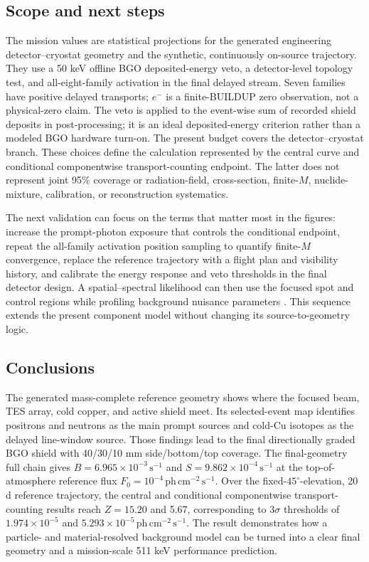 \documentclass[11pt]{article}
\newcommand{\phcms}{\ensuremath{\,\mathrm{ph\,cm^{-2}\,s^{-1}}}}
\newcommand{\cps}{\ensuremath{\,\mathrm{s^{-1}}}}
\newcommand{\fzero}{F_{0}}
\begin{document}
\subsection{Scope and next steps}
\label{subsec:limitations}

The mission values are statistical projections for the generated engineering
detector--cryostat geometry and the synthetic, continuously on-source trajectory.
They use a 50 keV offline BGO deposited-energy veto, a detector-level topology
test, and all-eight-family activation in
the final delayed stream. Seven families have positive delayed transports; $e^-$
is a finite-BUILDUP zero observation, not a physical-zero claim. The veto is
applied to the event-wise sum of recorded shield deposits in post-processing;
it is an ideal deposited-energy criterion rather than a modeled BGO hardware
turn-on. The present budget covers the detector--cryostat branch. These choices define the calculation
represented by the central curve and conditional componentwise transport-counting
endpoint. The latter does not represent joint 95\% coverage or radiation-field,
cross-section, finite-$M$, nuclide-mixture, calibration, or reconstruction
systematics.

The next validation can focus on the terms that matter most in the figures: increase
the prompt-photon exposure that controls the conditional endpoint, repeat the
all-family activation position sampling to quantify finite-$M$ convergence, replace the reference trajectory
with a flight plan and visibility history, and calibrate the energy response and veto
thresholds in the final detector design. A spatial--spectral likelihood can then use
the focused spot and control regions while profiling background nuisance parameters
\cite{Cowan2011}. This sequence extends the present component model without
changing its source-to-geometry logic.

\subsection{Conclusions}
\label{sec:conclusions}

The generated mass-complete reference geometry shows where the focused beam, TES array,
cold copper, and active shield meet. Its selected-event map identifies positrons and
neutrons as the main prompt sources and cold-Cu isotopes as the delayed line-window
source. Those findings lead to the final directionally graded BGO shield with
40/30/10 mm side/bottom/top coverage. The final-geometry full chain gives
$B=6.965\times10^{-3}\cps$ and $S=9.862\times10^{-4}\cps$ at the
top-of-atmosphere reference flux $\fzero=10^{-4}\phcms$. Over the fixed-$45^\circ$-elevation,
20 d reference trajectory, the central and conditional componentwise
transport-counting results reach $Z=15.20$ and 5.67, corresponding to
$3\sigma$ thresholds of $1.974\times10^{-5}$ and
$5.293\times10^{-5}\phcms$. The result demonstrates how a particle- and
material-resolved background model can be turned into a clear final geometry and
a mission-scale 511 keV performance prediction.
\end{document}
